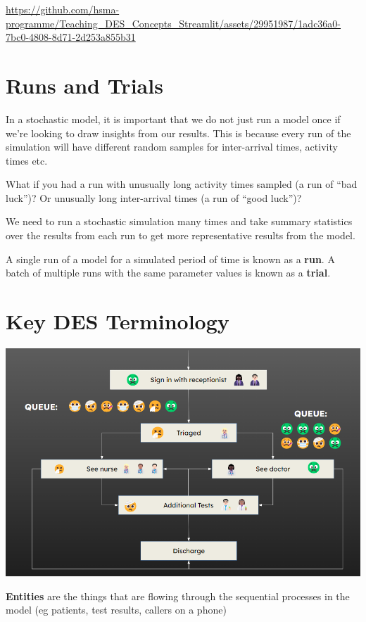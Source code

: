 \documentclass[
  letterpaper,
  DIV=11,
  numbers=noendperiod]{scrreprt}
\begin{document}
\url{https://github.com/hsma-programme/Teaching_DES_Concepts_Streamlit/assets/29951987/1adc36a0-7bc0-4808-8d71-2d253a855b31}

\section{Runs and Trials}\label{runs-and-trials}

In a stochastic model, it is important that we do not just run a model
once if we're looking to draw insights from our results. This is because
every run of the simulation will have different random samples for
inter-arrival times, activity times etc.

What if you had a run with unusually long activity times sampled (a run
of ``bad luck'')? Or unusually long inter-arrival times (a run of ``good
luck'')?

We need to run a stochastic simulation many times and take summary
statistics over the results from each run to get more representative
results from the model.

A single run of a model for a simulated period of time is known as a
\textbf{run}. A batch of multiple runs with the same parameter values is
known as a \textbf{trial}.

\section{Key DES Terminology}\label{key-des-terminology}

\includegraphics{images/example_des_simple.png}

\textbf{Entities} are the things that are flowing through the sequential
processes in the model (eg patients, test results, callers on a phone)
\end{document}
